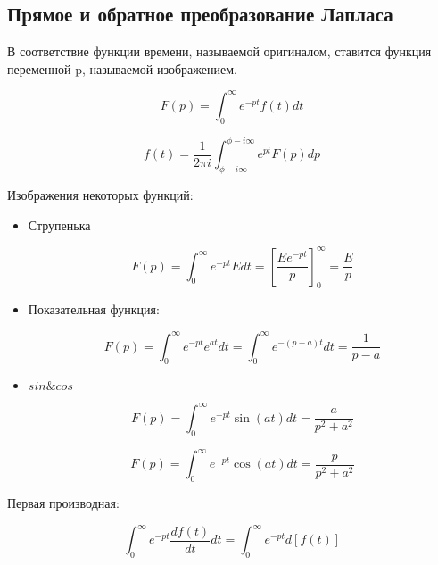 \subsection{Прямое и обратное преобразование Лапласа}

В соответствие функции времени, называемой оригиналом, ставится функция переменной p, называемой изображением.

\begin{equation}
F(p) = \int_0^\infty e^{-p t} f(t) dt
\end{equation}

\begin{equation}
f(t) = \frac{1}{2 \pi i} \int_{\phi - i \infty}^{\phi - i \infty} e^{p t} F(p) dp
\end{equation}


Изображения некоторых функций:


\begin{itemize}
\item 
Струпенька

\begin{equation}
F(p)=\int_0^\infty e^{-p t} E dt =  \left[ \frac{E e^{-p t}}{p} \right]_0^\infty = \frac{E}{p}
\end{equation}


\item

Показательная функция:

\begin{equation}
F(p)=\int_0^\infty e^{-p t} e^{a t} dt = \int_0^\infty e^{-(p-a) t}  dt = \frac{1}{p-a}
\end{equation}

\item

$ sin \& cos$ 

\begin{equation}
F(p) = \int_0^\infty e^{-p t} \sin(a t) dt = \frac{a}{{p}^{2}+{a}^{2}}
\end{equation}

\begin{equation}
F(p) = \int_0^\infty e^{-p t} \cos(a t) dt = \frac{p}{{p}^{2}+{a}^{2}}
\end{equation}

\end{itemize}

Первая производная:


\begin{equation}
\int_0^\infty e^{-p t} \frac{df(t)}{dt} dt = \int_0^\infty e^{-p t} d [f(t)]
\end{equation}


